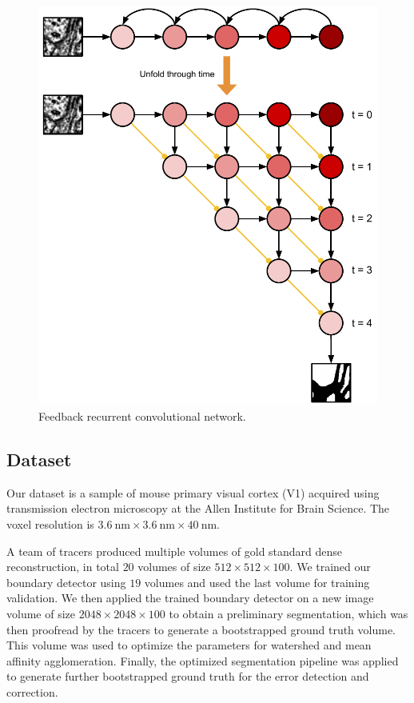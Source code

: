 \documentclass{article}
\begin{document}
\begin{appendices}
\begin{figure}[!t]
\centering
\includegraphics[width=0.65\linewidth]{unfold.pdf}
\caption{Feedback recurrent convolutional network.}
\label{fig:unfold}
\end{figure}

\subsection{Dataset}
Our dataset is a sample of mouse primary visual cortex (V1) acquired using
transmission electron microscopy at the Allen Institute for Brain Science. The
voxel resolution is $3.6~\text{nm} \times 3.6~\text{nm} \times 40~\text{nm}$.

A team of tracers produced multiple volumes of gold standard dense reconstruction, in total $20$ volumes of size $512 \times 512 \times 100$. We trained our boundary detector using $19$ volumes and used the last volume for training validation. We then applied the trained boundary detector on a new image volume of size $2048 \times 2048 \times 100$ to obtain a preliminary segmentation, which was then proofread by the tracers to generate a bootstrapped ground truth volume. This volume was used to optimize the parameters for watershed and mean affinity agglomeration. Finally, the optimized segmentation pipeline was applied to generate further bootstrapped ground truth for the error detection and correction.


\end{appendices}
\end{document}
